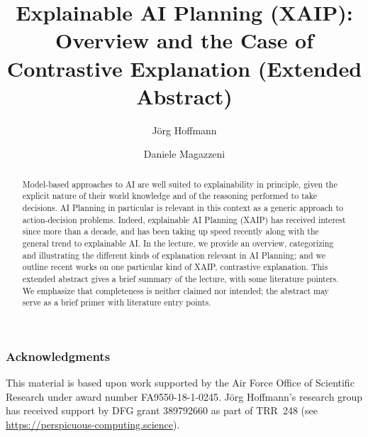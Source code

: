 \documentclass{llncs}
\begin{document}

\title{Explainable AI Planning (XAIP): Overview and the Case of
  Contrastive Explanation (Extended Abstract)}

\author{J\"org Hoffmann \and Daniele Magazzeni}


\maketitle

\begin{abstract}
Model-based approaches to AI are well suited to explainability in
principle, given the explicit nature of their world knowledge and of
the reasoning performed to take decisions. AI Planning in particular
is relevant in this context as a generic approach to action-decision
problems. Indeed, explainable AI Planning (XAIP) has received interest
since more than a decade, and has been taking up speed recently along
with the general trend to explainable AI. In the lecture, we provide
an overview, categorizing and illustrating the different kinds of
explanation relevant in AI Planning; and we outline recent works on
one particular kind of XAIP, contrastive explanation. This extended
abstract gives a brief summary of the lecture, with some literature
pointers. We emphasize that completeness is neither claimed nor
intended; the abstract may serve as a brief primer with literature
entry points.
\end{abstract}










\subsubsection*{Acknowledgments}

This material is based upon work supported by the Air Force Office of
Scientific Research under award number FA9550-18-1-0245. J\"org
Hoffmann's research group has received support by DFG grant 389792660
as part of TRR~248 (see \url{https://perspicuous-computing.science}).



\end{document}
